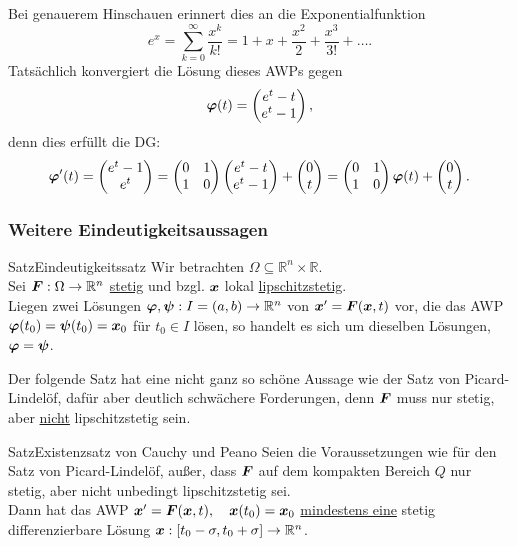\begin{Beispiel}
Bei genauerem Hinschauen erinnert dies an die Exponentialfunktion 
\begin{equation*}
    e^x=\sum_{k=0}^\infty\frac{x^k}{k!}=1+x+\frac{x^2}{2}+\frac{x^3}{3!}+\ldots.
\end{equation*}
Tatsächlich konvergiert die Lösung dieses AWPs gegen
\begin{equation*}
    {{\text{\boldmath${\varphi}$}}}(t)=\begin{pmatrix}e^t-t\\e^t-1\end{pmatrix},
\end{equation*}
denn dies erfüllt die DG:
\begin{equation*}
    {{\text{\boldmath${\varphi}$}}}'(t)=\begin{pmatrix}e^t-1\\e^t\end{pmatrix}=\begin{pmatrix}0&1\\1&0\end{pmatrix}\begin{pmatrix}e^t-t\\e^t-1\end{pmatrix}+\begin{pmatrix}0\\t\end{pmatrix}=\begin{pmatrix}0&1\\1&0\end{pmatrix}{{\text{\boldmath${\varphi}$}}}(t)+\begin{pmatrix}0\\t\end{pmatrix}.
\end{equation*}
\end{Beispiel}

\subsubsection{Weitere Eindeutigkeitsaussagen}
\begin{Satz}
{Satz}{Eindeutigkeitssatz}
Wir betrachten $\Omega\subseteq \mathbb{R}^n\times \mathbb{R}$.\\
Sei ${{\text{\boldmath${F}$}}}:\Omega\to\mathbb{R}^n$ \underline{stetig} und bzgl. ${{\text{\boldmath${x}$}}}$ lokal \underline{lipschitzstetig}.\\
Liegen zwei Lösungen ${{\text{\boldmath${\varphi}$}}},{{\text{\boldmath${\psi}$}}}:I=(a,b)\to\mathbb{R}^n$ von ${{\text{\boldmath${x}$}}}'={{\text{\boldmath${F}$}}}({{\text{\boldmath${x}$}}},t)$ vor, die das AWP ${{\text{\boldmath${\varphi}$}}}(t_0)={{\text{\boldmath${\psi}$}}}(t_0)={{\text{\boldmath${x}$}}}_0$ für $t_0\in I$ lösen, so handelt es sich um dieselben Lösungen, ${{\text{\boldmath${\varphi}$}}}={{\text{\boldmath${\psi}$}}}$.
\end{Satz}

Der folgende Satz hat eine nicht ganz so schöne Aussage wie der Satz von Picard-Lindelöf, dafür aber deutlich schwächere Forderungen, denn ${{\text{\boldmath${F}$}}}$ muss nur stetig, aber \underline{nicht} lipschitzstetig sein.
\begin{Satz}
{Satz}{Existenzsatz von Cauchy und Peano}
Seien die Voraussetzungen wie für den Satz von Picard-Lindelöf, außer, dass ${{\text{\boldmath${F}$}}}$ auf dem kompakten Bereich $Q$ nur stetig, aber nicht unbedingt lipschitzstetig sei.\\
Dann hat das AWP ${{\text{\boldmath${x}$}}}'={{\text{\boldmath${F}$}}}({{\text{\boldmath${x}$}}},t),\quad {{\text{\boldmath${x}$}}}(t_0)={{\text{\boldmath${x}$}}}_0$ \underline{mindestens eine} stetig differenzierbare Lösung ${{\text{\boldmath${x}$}}}:[t_0-\sigma, t_0+\sigma]\to\mathbb{R}^n$.
\end{Satz}

